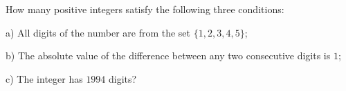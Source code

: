 How many positive integers satisfy the following three conditions:

a) All digits of the number are from the set $\{1,2,3,4,5\}$;

b) The absolute value of the difference between any two consecutive digits is $1$;

c) The integer has $1994$ digits?